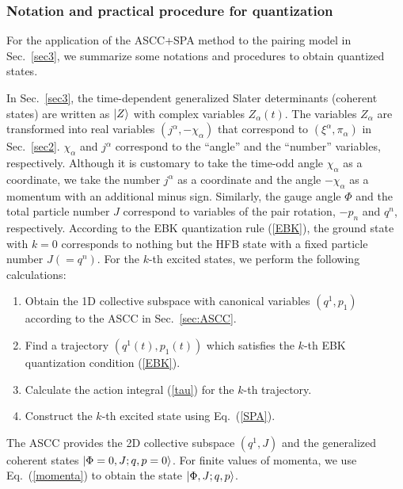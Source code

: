 \documentclass[11pt]{book} %
\begin{document}
\subsubsection{Notation and practical procedure for quantization}
\label{sec:notation}

For the application of the ASCC+SPA method to the pairing model in Sec.~\ref{sec3},
we summarize some notations and procedures to obtain quantized states.

In Sec.~\ref{sec3}, the time-dependent generalized Slater determinants
(coherent states) are written as $\ket{Z}$ with complex variables
$Z_\alpha(t)$.
The variables $Z_\alpha$ are transformed into real variables
$(j^\alpha, -\chi_\alpha)$ that correspond to $(\xi^\alpha,\pi_\alpha)$
in Sec.~\ref{sec2}.
$\chi_\alpha$ and $j^\alpha$ correspond to
the ``angle'' and the ``number'' variables, respectively.
Although it is customary to take the time-odd angle $\chi_\alpha$ as a coordinate,
we take the number $j^\alpha$ as a coordinate and the angle $-\chi_\alpha$ as a momentum with an additional minus sign.
Similarly, the gauge angle $\Phi$ and the total particle number $J$
correspond to variables of the pair rotation, $-p_n$ and $q^n$, respectively.
According to the EBK quantization rule (\ref{EBK}),
the ground state with $k=0$ corresponds to nothing but the HFB state
with a fixed particle number $J(=q^n)$.
For the $k$-th excited states, we perform the following calculations:
\begin{enumerate}
\item Obtain the 1D collective subspace with canonical variables $(q^1,p_1)$
	according to the ASCC in Sec.~\ref{sec:ASCC}.
\item Find a trajectory $(q^1(t),p_1(t))$ which satisfies
the $k$-th EBK quantization condition (\ref{EBK}).
\item Calculate the action integral (\ref{tau}) for the $k$-th trajectory.
\item Construct the $k$-th excited state using Eq.~(\ref{SPA}).
\end{enumerate}
The ASCC provides the 2D collective subspace $(q^1,J)$
and the generalized coherent states $\ket{\Phi=0,J;q,p=0}$.
For finite values of momenta, we use Eq.~(\ref{momenta})
to obtain the state $\ket{\Phi,J;q,p}$.

\end{document}
